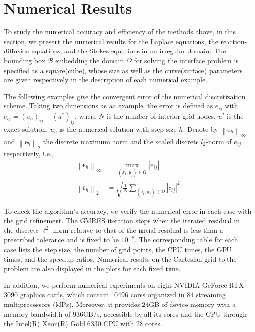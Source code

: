 \section{Numerical Results} \label{result}

To study the numerical accuracy and efficiency of the methods above, in this section, we present the numerical results for the Laplace equations, the reaction-diffusion equations, and the Stokes equations in an irregular domain. The bounding box $\mathcal{B}$ embedding the domain $\Omega$ for solving the interface problem is specified as a square(cube), whose size as well as the curve(surface) parameters are given respectively in the description of each numerical example.

The following examples give the convergent error of the numerical discretization scheme. Taking two dimensions as an example, the error is defined as $e_{i j}$ with $e_{i j}=\left(u_h\right)_{i j}-\left(u^*\right)_{i j}$, where $N$ is the number of interior grid nodes, $u^*$ is the exact solution, $u_h$ is the numerical solution with step size $h$. Denote by $\left\|\mathrm{e}_h\right\|_{\infty}$ and $\left\|\mathrm{e}_h\right\|_2$ the discrete maximum norm and the scaled discrete $l_2$-norm of $e_{i j}$ respectively, i.e.,
$$
\begin{aligned}
\left\|\mathbf{e}_h\right\|_{\infty} & =\max _{\left(x_i, y_j\right) \in \Omega}\left|e_{i j}\right| \\
\left\|\mathbf{e}_h\right\|_2 & =\sqrt{\frac{1}{N} \sum_{\left(x_i, y_j\right) \in \Omega}\left|e_{i j}\right|^2}
\end{aligned}
$$

To check the algorithm's accuracy, we verify the numerical error in each case with the grid refinement. The GMRES iteration stops when the iterated residual in the discrete $\ell^2$-norm relative to that of the initial residual is less than a prescribed tolerance and is fixed to be $10^{-8}$. The corresponding table for each case lists the step size, the number of grid points, the CPU times, the GPU times, and the speedup ratios. Numerical results on the Cartesian grid to the problem are also displayed in the plots for each fixed time.

In addition, we perform numerical experiments on eight NVIDIA GeForce RTX 3090 graphics cards, which contain 10496 cores organized in 84 streaming multiprocessors (MPs). Moreover, it provides 24GB of device memory with a memory bandwidth of 936GB/s, accessible by all its cores and the CPU through the Intel(R) Xeon(R) Gold 6330 CPU with 28 cores.

